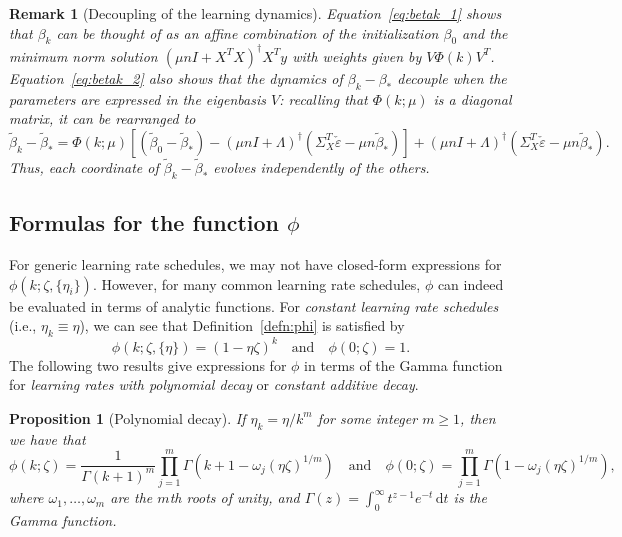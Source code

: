 \documentclass[11pt]{article}
\newtheorem{proposition}[theorem]{Proposition}
\newtheorem{remark}{Remark}
\begin{document}
\begin{remark}[Decoupling of the learning dynamics]
Equation~\eqref{eq:betak_1} shows that $\beta_k$ can be thought of as an affine combination of the initialization $\beta_0$ and the minimum norm solution $(\mu n I + X^TX)^\dagger X^T y$ with weights given by $V\Phi(k)V^T$.
Equation~\eqref{eq:betak_2} also shows that the dynamics of $\beta_k - \beta_*$ decouple when the parameters are expressed in the eigenbasis $V$: recalling that $\Phi(k;\mu)$ is a diagonal matrix, it can be rearranged to
\begin{equation} \label{eq:decouple}
    \tilde{\beta}_k - \tilde{\beta}_*
    = \Phi(k;\mu)\left[(\tilde{\beta}_0 - \tilde{\beta}_*) - (\mu n I + \Lambda)^{\dagger} (\Sigma_X^T \check{\varepsilon} - \mu n \tilde{\beta}_*) \right] + (\mu n I + \Lambda)^{\dagger} (\Sigma_X^T \check{\varepsilon} - \mu n \tilde{\beta}_*). 
\end{equation}
Thus, each coordinate of $\tilde{\beta}_k - \tilde{\beta}_*$ evolves independently of the others. 
\end{remark}


\subsection{Formulas for the function \texorpdfstring{$\phi$}{phi}} \label{sec:phi-exact-expressions}
For generic learning rate schedules, we may not have closed-form expressions for $\phi(k; \zeta, \{ \eta_i\} )$. However, for many common learning rate schedules, $\phi$ can indeed be evaluated in terms of analytic functions.
For \emph{constant learning rate schedules} (i.e., $\eta_k \equiv \eta$), we can see that Definition~\ref{defn:phi} is satisfied by
\[
    \phi(k; \zeta, \{\eta\}) = \left( 1 - \eta \zeta\right)^k \quad \text{and} \quad \phi(0;\zeta) = 1.
\]
The following two results give expressions for $\phi$ in terms of the Gamma function for \emph{learning rates with polynomial decay} or \emph{constant additive decay}.

\begin{proposition}[Polynomial decay] \label{prop:polynomial}
If $\eta_k = \eta/k^m$ for some integer $m \geq 1$, then we have that
\begin{equation} \label{eq:polynomial}
    \phi(k; \zeta) = \frac{1}{\Gamma(k+1)^m} \prod_{j=1}^m \Gamma(k+1 - \omega_j (\eta \zeta)^{1/m}) \quad \text{and} \quad \phi(0; \zeta) = \prod_{j=1}^m \Gamma(1 - \omega_j(\eta \zeta)^{1/m}),
\end{equation}
where $\omega_1, \ldots, \omega_m$ are the $m$th roots of unity, and $\Gamma(z) = \int^\infty_0 t^{z-1} e^{-t} \,\mathrm{d}t$ is the Gamma function.
\end{proposition}
\end{document}
